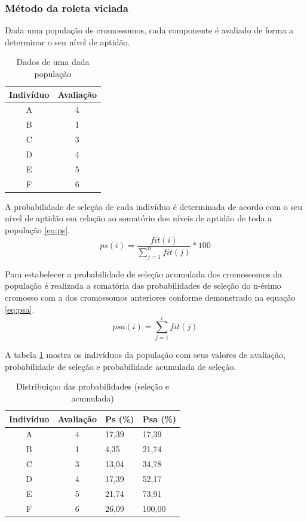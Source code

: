 \documentclass[twoside]{article}
\begin{document}
\begin{multicols}{2}
\subsubsection{Método da roleta viciada}
Dada uma população de cromossomos, cada componente é avaliado de forma a determinar o seu nível de aptidão. 
\begin{table}[H]
\caption{Dados de uma dada população}
\centering
\begin{tabular}{cc}
\toprule
Indivíduo & Avaliação \\
\midrule
A & 4\\
B & 1\\
C & 3\\
D & 4\\
E & 5\\
F & 6\\
\bottomrule
\end{tabular}
\end{table}

A probabilidade de seleção de cada indivíduo é determinada de acordo com o seu nível de aptidão em relação ao somatório dos níveis de aptidão de toda a população \ref{eq:ps}. 
\begin{equation}
\label{eq:ps}
ps(i) = \frac {fit(i)}{\sum\limits_{j=1}^n fit(j)} * 100
\end{equation}

Para estabelecer a probabilidade de seleção acumulada dos cromossomos da população é realizada a somatória das probabilidades de seleção do n-ésimo cromosso com a dos cromossomos anteriores conforme demonstrado na equação \ref{eq:psa}.
\begin{equation}
\label{eq:psa}
psa(i) = \sum\limits_{j=1}^i fit(j)
\end{equation}

A tabela \ref{tab:popinfo} mostra os indivíduos da população com seus valores de avaliação, probabilidade de seleção e probabilidade acumulada de seleção.
\begin{table}[H]
\label{tab:popinfo}
\caption{Distribuiçao das probabilidades (seleção e acumulada)}
\centering
\begin{tabular}{ccll}
\toprule
Indivíduo & Avaliação & Ps (\%) & Psa (\%) \\
\midrule
A & 4 & 17,39 & 17,39\\
B & 1 & 4,35 & 21,74\\
C & 3 & 13,04 & 34,78\\
D & 4 & 17,39 & 52,17\\
E & 5 & 21,74 & 73,91\\
F & 6 & 26,09 & 100,00\\
\bottomrule
\end{tabular}
\end{table}


\end{multicols}
\end{document}
